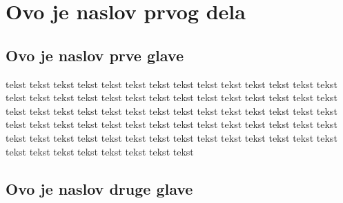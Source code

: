 \documentclass[a4paper,openany,twoside,12pt]{memoir}
\begin{document}


\part{Ovo je naslov prvog dela}

\chapter{Ovo je naslov prve glave}

tekst tekst tekst tekst tekst tekst tekst tekst tekst tekst tekst tekst tekst 
tekst tekst tekst tekst tekst tekst tekst tekst tekst tekst tekst tekst tekst 
tekst tekst tekst tekst tekst tekst tekst tekst tekst tekst tekst tekst tekst 
tekst tekst tekst tekst tekst tekst tekst tekst tekst tekst tekst tekst tekst 
tekst tekst tekst tekst tekst tekst tekst tekst tekst tekst tekst tekst tekst 
tekst tekst tekst tekst tekst tekst tekst tekst tekst tekst tekst tekst tekst 

\chapter{Ovo je naslov druge glave}
\end{document}

